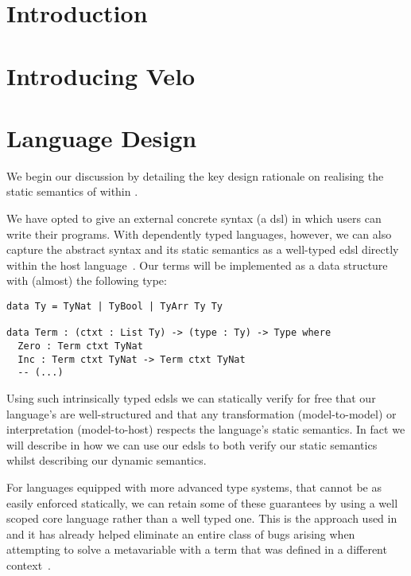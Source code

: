 \documentclass[%
draft, %
a4paper,
UKenglish,
cleveref,
autoref,
thm-restate,
pdfa
]{oasics-v2021}
\begin{document}

\section{Introduction}
\label{sec:introduction}




\section{Introducing Velo}
\label{sec:velo}



\section{Language Design}
\label{sec:design}

We begin our discussion by detailing the key design rationale on
realising the static semantics of \Velo{} within \Idris{}.

We have opted to give \Velo{} an external concrete syntax (a \ac{dsl})
in which users can write their programs.
%
With dependently typed languages, however, we can also capture
the abstract syntax and its static semantics as a well-typed \ac{edsl}
directly within the host language~\cite{Augustsson1999edt}.
%
Our terms will be implemented as a data structure with (almost) the following type:

\begin{Verbatim}
data Ty = TyNat | TyBool | TyArr Ty Ty

data Term : (ctxt : List Ty) -> (type : Ty) -> Type where
  Zero : Term ctxt TyNat
  Inc : Term ctxt TyNat -> Term ctxt TyNat
  -- (...)
\end{Verbatim}

\noindent
Using such intrinsically typed \acp{edsl} we can statically verify for free
that our language's are well-structured and that any transformation (model-to-model)
or interpretation (model-to-host) respects the language's static semantics.
%
In fact we will describe in  how we can use our \acp{edsl}
to both verify our static semantics whilst describing our dynamic semantics.

For languages equipped with more advanced type systems, that cannot be as easily
enforced statically, we can retain some of these guarantees by using a well
scoped core language rather than a well typed one.
%
This is the approach used in \Idris{} and it has already helped eliminate an
entire class of bugs arising when attempting to solve a metavariable with a
term that was defined in a different context~\cite{DBLP:conf/ecoop/Brady21}.
\end{document}
